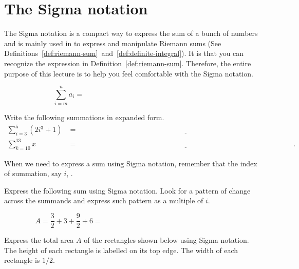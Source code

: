 \documentclass[../main.tex]{subfiles}
\begin{document}
 \section{The Sigma notation}
The Sigma notation is a compact way to express the sum of a bunch of numbers and is mainly used in \thiscourse{} to express and manipulate Riemann sums (See Definitions~\ref{def:riemann-sum}~and~\ref{def:definite-integral}).  It is  that you can recognize the expression in Definition~\ref{def:riemann-sum}.  Therefore, the entire purpose of this lecture is to help you feel comfortable with the Sigma notation.


{\huge \[ \sum_{i=m}^{n} a_{i} = \hspace{3in}\]}


\begin{example} \label{ex:sigma-notation-read}
  Write the following summations in expanded form.
  \begin{align*}
    \sum_{i=3}^{5} (2i^{3} + 1)
    &= \underline{\hspace{5in}} \\[3ex]
    \sum_{k=10}^{13} x
    &= \underline{\hspace{5in}}.
  \end{align*}
\end{example}

When we need to express a sum using Sigma notation, remember that the index of summation, say \(i\), . 

\begin{example}
  Express the following sum using Sigma notation. Look for a pattern of change across the summands and express such pattern as a multiple of \(i\).

  \[
    A = \frac{3}{2} + 3 + \frac{9}{2} + 6 = \hspace{3in}
  \]
\end{example}
\clearpage

\begin{exercise}
  Express the total area \(A\) of the rectangles shown below using Sigma notation. The height of each rectangle is labelled on its top edge.  The width of each rectangle is \(1/2\).

  \begin{center}
    
  \end{center}

\end{exercise}
\end{document}
